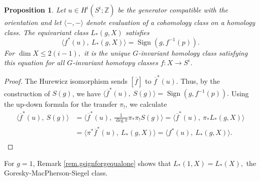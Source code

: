 \documentclass{amsart}
\newtheorem{prop}[thm]{Proposition}
\theoremstyle{definition}
\theoremstyle{remark}
\newcommand {\intg}  {\ensuremath{\mathbb{Z}}}
\newcommand {\Sign}    {{\ensuremath{\operatorname{Sign}}}}
\begin{document}
\begin{prop} \label{prop.evaloflgxissigngpreim}
Let $u\in H^i (S^i;\intg)$ be the generator compatible with the orientation
and let $\langle -,- \rangle$ denote evaluation of a cohomology class on
a homology class.
The equivariant class $L_* (g,X)$ satisfies
\begin{equation} \label{equ.fulgxissigngfinvp}
\langle f^* (u),~ L_* (g,X) \rangle = \Sign (g,f^{-1} (p)). 
\end{equation}
For $\dim X \leq 2(i-1),$
it is the unique $G$-invariant homology class satisfying this equation
for all $G$-invariant homotopy classes $f: X \to S^i$.
\end{prop}
\begin{proof}
The Hurewicz isomorphism sends $[\overline{f}]$ to
$\overline{f}^* (u)$.
Thus, by the construction of $S(g)$, we have
$\langle \overline{f}^* (u),~ S(g) \rangle 
  = \Sign (g, f^{-1} (p)).$
Using the up-down formula for the transfer $\pi_!$, we calculate
\begin{align*}  
\langle \overline{f}^* (u),~ S(g) \rangle
&= \langle \overline{f}^* (u),~ \frac{1}{\deg \pi} \pi_* \pi_! S(g) \rangle 
 = \langle \overline{f}^* (u),~ \pi_* L_* (g,X) \rangle \\  
&= \langle \pi^* \overline{f}^* (u),~ L_* (g,X) \rangle 
 = \langle f^* (u),~ L_* (g,X) \rangle. \\ 
\end{align*}  
\end{proof}

For $g=1$, Remark \ref{rem.gsignforgequalone} shows that
 $L_* (1,X) = L_* (X),$ the Goresky-MacPherson-Siegel class.
\end{document}
